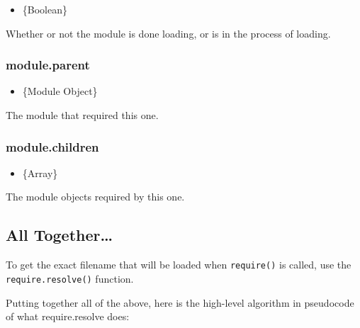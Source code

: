 \begin{itemize}
\itemsep1pt\parskip0pt
\item
  \{Boolean\}
\end{itemize}

Whether or not the module is done loading, or is in the process of
loading.

\subsubsection{module.parent}\label{module.parent}

\begin{itemize}
\itemsep1pt\parskip0pt
\item
  \{Module Object\}
\end{itemize}

The module that required this one.

\subsubsection{module.children}\label{module.children}

\begin{itemize}
\itemsep1pt\parskip0pt
\item
  \{Array\}
\end{itemize}

The module objects required by this one.

\subsection{All Together\ldots{}}\label{all-together}

To get the exact filename that will be loaded when \texttt{require()} is
called, use the \texttt{require.resolve()} function.

Putting together all of the above, here is the high-level algorithm in
pseudocode of what require.resolve does:

